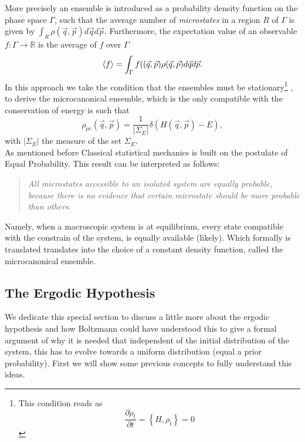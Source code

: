 \indent More precisely an ensemble is introduced as a probability density function on the phase space $\Gamma$, such that the average number of \textit{microstates} in a region $R$ of $\Gamma$ is given by $\int_{R}\rho(\vec{q},\vec{p}) d\vec{q}d\vec{p}$. Furthermore, the expectation value of an observable $f:\Gamma\rightarrow\mathbb{R}$ is the average of $f$ over $\Gamma$
\begin{equation}
\mathinner{\langle{f}\rangle} = \int_{\Gamma} f((\vec{q},\vec{p})\rho(\vec{q},\vec{p})d\vec{q}d\vec{p}.
\label{CH1:Average_ensemble}
\end{equation}
\indent In this approach we take the condition that the ensembles must be stationary\footnote{This condition reads as
\[\frac{\partial \rho_{t}}{\partial t}=\left\{H, \rho_{t}\right\} = 0\]} , to derive the microcanonical ensemble, which is the only compatible with the conservation of energy is such that
\begin{equation}
\rho_{\mathrm{\mu c}}(\vec{q},\vec{p})=\frac{1}{\left|\Sigma_{E}\right|} \delta(H(\vec{q},\vec{p})-E),
\label{CH1:Microcanonical_ensemble}
\end{equation}
with $|\Sigma_E|$ the measure of the set $\Sigma_E$.\\

\indent As mentioned before Classical statistical mechanics is built on the postulate of Equal Probability.
This result can be interpreted as follows:

\begin{quote}
\textit{All microstates accessible to an isolated system are equally probable, because there is no evidence that certain microstate should be more probable than others.}
\end{quote}
\indent Namely, when  a macroscopic system is at equilibrium, every state compatible with the constrain of the system, is equally available (likely). Which formally is translated translates into the choice of a constant density function, called the microcanonical ensemble.
\subsection{The Ergodic Hypothesis}
We dedicate this special section to discuss a little more about the ergodic hypothesis and how Boltzmann could have understood this to give a formal argument of  why it is needed that independent of the initial distribution of the system, this has to evolve towards a uniform distribution (equal a prior probability). First we will show some previous concepts to fully understand this ideas.\\

